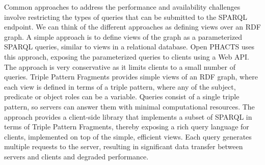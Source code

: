 Common approaches to address the performance and availability challenges involve restricting the types of queries that can be submitted to the SPARQL endpoint.
We can think of the different approaches as defining views over an RDF graph.
A simple approach is to define views of the graph as a parameterized SPARQL queries, similar to views in a relational database.
Open PHACTS uses this approach, exposing the parameterized queries to clients using a Web API.
The approach is very conservative as it limits clients to a small number of queries.
%
Triple Pattern Fragments \cite{Verborgh2014} provides simple views of an RDF graph, where each view is defined in terms of a triple pattern, where any of the subject, predicate or object roles can be a variable.
Queries consist of a single triple pattern, so servers can answer them with minimal computational resources.
The approach provides a client-side library that implements a subset of SPARQL in terms of Triple Pattern Fragments, thereby exposing a rich query language for clients, implemented on top of the simple, efficient views.
Each query generates multiple requests to the server, resulting in significant data transfer between servers and clients and degraded performance. 

